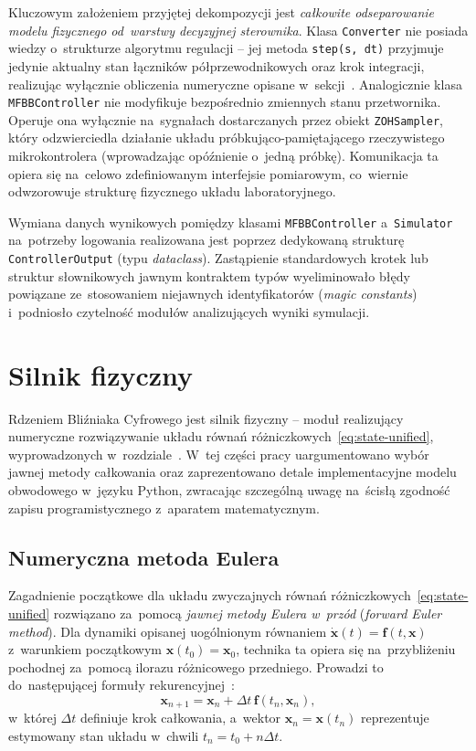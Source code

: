 Kluczowym założeniem przyjętej dekompozycji jest \emph{całkowite odseparowanie modelu fizycznego od~warstwy decyzyjnej sterownika}. Klasa \texttt{Converter} nie posiada wiedzy o~strukturze algorytmu regulacji -- jej metoda \texttt{step(s,\,dt)} przyjmuje jedynie aktualny stan łączników półprzewodnikowych oraz krok integracji, realizując wyłącznie obliczenia numeryczne opisane w~sekcji~. Analogicznie klasa \texttt{MFBBController} nie modyfikuje bezpośrednio zmiennych stanu przetwornika. Operuje ona wyłącznie na~sygnałach dostarczanych przez obiekt \texttt{ZOHSampler}, który odzwierciedla działanie układu próbkująco-pamiętającego rzeczywistego mikrokontrolera (wprowadzając opóźnienie o~jedną próbkę). Komunikacja ta opiera się na~celowo zdefiniowanym interfejsie pomiarowym, co~wiernie odwzorowuje strukturę fizycznego układu laboratoryjnego.

Wymiana danych wynikowych pomiędzy klasami \texttt{MFBBController} a~\texttt{Simulator} na~potrzeby logowania realizowana jest poprzez dedykowaną strukturę \texttt{ControllerOutput} (typu \emph{dataclass}). Zastąpienie standardowych krotek lub struktur słownikowych jawnym kontraktem typów wyeliminowało błędy powiązane ze~stosowaniem niejawnych identyfikatorów (\emph{magic constants}) i~podniosło czytelność modułów analizujących wyniki symulacji.

\section{Silnik fizyczny}
\label{sec:silnik}

Rdzeniem Bliźniaka Cyfrowego jest silnik fizyczny -- moduł realizujący numeryczne rozwiązywanie układu równań różniczkowych~\eqref{eq:state-unified}, wyprowadzonych w~rozdziale~. W~tej części pracy uargumentowano wybór jawnej metody całkowania oraz zaprezentowano detale implementacyjne modelu obwodowego w~języku Python, zwracając szczególną uwagę na~ścisłą zgodność zapisu programistycznego z~aparatem matematycznym.

\subsection{Numeryczna metoda Eulera}
\label{subsec:euler}

Zagadnienie początkowe dla układu zwyczajnych równań różniczkowych~\eqref{eq:state-unified} rozwiązano za~pomocą \emph{jawnej metody Eulera w~przód} (\emph{forward Euler method}). Dla dynamiki opisanej uogólnionym równaniem $\dot{\mathbf{x}}(t)=\mathbf{f}(t,\mathbf{x})$ z~warunkiem początkowym $\mathbf{x}(t_0)=\mathbf{x}_0$, technika ta opiera się na~przybliżeniu pochodnej za~pomocą ilorazu różnicowego przedniego. Prowadzi to do~następującej formuły rekurencyjnej~\cite{hairer1993}:
\begin{equation}
    \mathbf{x}_{n+1} = \mathbf{x}_n + \Delta t\,\mathbf{f}(t_n,\mathbf{x}_n),
    \label{eq:euler-forward}
\end{equation}
w~której $\Delta t$ definiuje krok całkowania, a~wektor $\mathbf{x}_n=\mathbf{x}(t_n)$ reprezentuje estymowany stan układu w~chwili $t_n=t_0+n\Delta t$.

